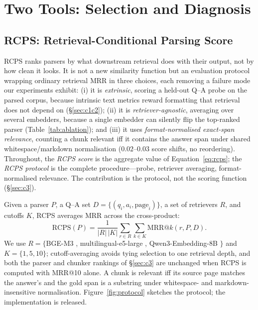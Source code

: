 \documentclass[11pt]{article}
\newcommand{\rcps}{\textsc{RCPS}}
\begin{document}
\section{Two Tools: Selection and Diagnosis}

\subsection{\rcps{}: Retrieval-Conditional Parsing Score}
\label{sec:rcps}

\rcps{} ranks parsers by what downstream retrieval does with their output, not by how clean it looks. It is not a new similarity function but an evaluation protocol wrapping ordinary retrieval MRR in three choices, each removing a failure mode our experiments exhibit: (i) it is \emph{extrinsic}, scoring a held-out Q--A probe on the parsed corpus, because intrinsic text metrics reward formatting that retrieval does not depend on (\S\ref{sec:c1c2}); (ii) it is \emph{retriever-agnostic}, averaging over several embedders, because a single embedder can silently flip the top-ranked parser (Table~\ref{tab:ablation}); and (iii) it uses \emph{format-normalised exact-span relevance}, counting a chunk relevant iff it contains the answer span under shared whitespace/markdown normalisation ($0.02$--$0.03$ score shifts, no reordering). Throughout, the \emph{\rcps{} score} is the aggregate value of Equation~\ref{eq:rcps}; the \emph{\rcps{} protocol} is the complete procedure---probe, retriever averaging, format-normalised relevance. The contribution is the protocol, not the scoring function (\S\ref{sec:c3}).

Given a parser $P$, a Q--A set $D = \{(q_i, a_i, \text{page}_i)\}$, a set of retrievers $R$, and cutoffs $K$, \rcps{} averages MRR across the cross-product:
\begin{equation}
\label{eq:rcps}
\text{RCPS}(P) = \frac{1}{|R|\,|K|} \sum_{r \in R} \sum_{k \in K} \text{MRR}@k(r, P, D).
\end{equation}
We use $R = \{$BGE-M3 \citep{chen2024bgem3}, multilingual-e5-large \citep{wang2024me5}, Qwen3-Embedding-8B \citep{qwen3emb}$\}$ and $K = \{1, 5, 10\}$; cutoff-averaging avoids tying selection to one retrieval depth, and both the parser and chunker rankings of \S\ref{sec:c3} are unchanged when \rcps{} is computed with MRR@10 alone. A chunk is relevant iff its source page matches the answer's and the gold span is a substring under whitespace- and markdown-insensitive normalisation. Figure~\ref{fig:protocol} sketches the protocol; the implementation is released.
\end{document}

